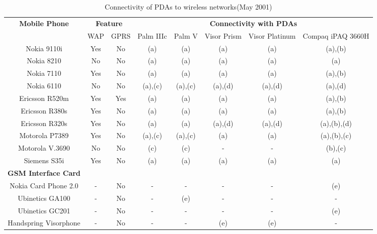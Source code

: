\begin{sidewaystable}[b]
\centering
\begin{tabular}{|c||c|c||c|c|c|c|c|} \hline
{\bf Mobile Phone} & \multicolumn{2}{|c||}{\bf Feature} & \multicolumn{5}{|c|}{\bf Connectivity with PDAs} \\ \cline{2-8}
& WAP & GPRS & Palm IIIc & Palm V & Visor Prism & Visor Platinum & Compaq iPAQ 3660H \\ \hline \hline
Nokia 9110i 	& Yes 	& No & (a) 	& (a) & (a) & (a) & (a),(b) \\ \hline
Nokia 8210 	& No	& No & (a) 	& (a) & (a) & (a) & (a)  \\ \hline
Nokia 7110 	& Yes 	& No & (a) 	& (a) & (a) & (a) & (a),(b) \\ \hline
Nokia 6110 	& No 	& No & (a),(c) & (a),(c) & (a),(d) & (a),(d) & (a),(d) \\ \hline
Ericsson R520m 	& Yes 	& Yes & (a) & (a) & (a) & (a) & (a),(b) \\ \hline
Ericsson R380s 	& Yes 	& No & (a) & (a) & (a) & (a) & (a),(b) \\ \hline
Ericsson R320s 	& Yes 	& No & (a) & (a) & (a),(d) & (a),(d) & (a),(b),(d) \\ \hline
Motorola P7389 	& Yes 	& No & (a),(c) & (a),(c) & (a) & (a) & (a),(b),(c) \\ \hline
Motorola V.3690 & No 	& No & (c) & (c) & - & - & (b),(c) \\ \hline
Siemens S35i	& Yes	& No & (a) & (a) & (a) & (a) & (a) \\ \hline\hline
{\bf GSM Interface Card} &  &  &  &  &  &  &  \\ \hline 
Nokia Card Phone 2.0 & - & No & - & - & - & - & (e) \\ \hline
Ubinetics GA100 & - & No & - & (e) & - & - & - \\ \hline
Ubinetics GC201 & - & No & - & - & - & - & (e) \\ \hline
Handspring Visorphone & - & No & - & - & (e) & (e) & - \\ \hline
\end{tabular} 
\caption{Connectivity of PDAs to wireless networks(May 2001)
\label{tablea1}}
\end{sidewaystable}

